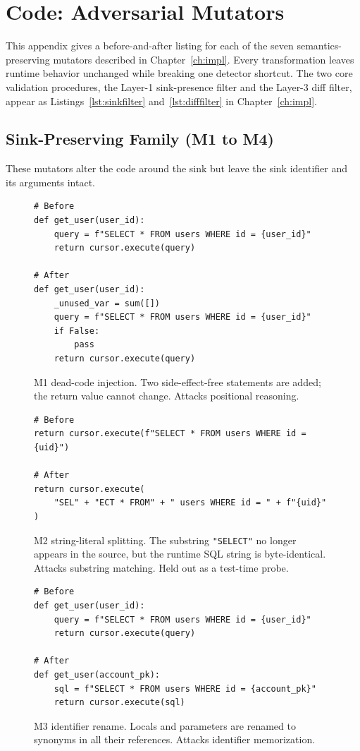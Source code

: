 \chapter{Code: Adversarial Mutators}
\label{apndx:code}

This appendix gives a before-and-after listing for each of the seven
semantics-preserving mutators described in Chapter~\ref{ch:impl}. Every
transformation leaves runtime behavior unchanged while breaking one detector
shortcut. The two core validation procedures, the Layer-1 sink-presence filter
and the Layer-3 diff filter, appear as Listings~\ref{lst:sinkfilter}
and~\ref{lst:difffilter} in Chapter~\ref{ch:impl}.

\section{Sink-Preserving Family (M1 to M4)}

These mutators alter the code around the sink but leave the sink identifier and
its arguments intact.

\begin{figure}[H]
\begin{verbatim}
# Before
def get_user(user_id):
    query = f"SELECT * FROM users WHERE id = {user_id}"
    return cursor.execute(query)

# After
def get_user(user_id):
    _unused_var = sum([])
    query = f"SELECT * FROM users WHERE id = {user_id}"
    if False:
        pass
    return cursor.execute(query)
\end{verbatim}
\caption{M1 dead-code injection. Two side-effect-free statements are added; the
return value cannot change. Attacks positional reasoning.}
\label{lst:m1}
\end{figure}

\begin{figure}[H]
\begin{verbatim}
# Before
return cursor.execute(f"SELECT * FROM users WHERE id = {uid}")

# After
return cursor.execute(
    "SEL" + "ECT * FROM" + " users WHERE id = " + f"{uid}"
)
\end{verbatim}
\caption{M2 string-literal splitting. The substring \texttt{"SELECT"} no longer
appears in the source, but the runtime SQL string is byte-identical. Attacks
substring matching. Held out as a test-time probe.}
\label{lst:m2}
\end{figure}

\begin{figure}[H]
\begin{verbatim}
# Before
def get_user(user_id):
    query = f"SELECT * FROM users WHERE id = {user_id}"
    return cursor.execute(query)

# After
def get_user(account_pk):
    sql = f"SELECT * FROM users WHERE id = {account_pk}"
    return cursor.execute(sql)
\end{verbatim}
\caption{M3 identifier rename. Locals and parameters are renamed to synonyms in
all their references. Attacks identifier memorization.}
\label{lst:m3}
\end{figure}

